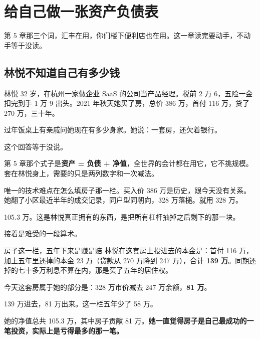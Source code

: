 \chapter{给自己做一张资产负债表}

\begin{ledetext}
第 5 章那三个词，汇丰在用，你们楼下便利店也在用。这一章读完要动手，不动手等于没读。
\end{ledetext}

\section{林悦不知道自己有多少钱}

林悦 32 岁，在杭州一家做企业 SaaS 的公司当产品经理。税前 2 万 6，五险一金扣完到手 1 万 9 出头。2021 年秋天她买了房，总价 386 万，首付 116 万，贷了 270 万，三十年。

过年饭桌上有亲戚问她现在有多少身家。她说：一套房，还欠着银行。

这个回答等于没说。

第 5 章那个式子是\textbf{资产 = 负债 + 净值}，全世界的会计都在用它，它不挑规模。套在林悦身上，需要的只是两列数字和一次减法。

唯一的技术难点在怎么填房子那一栏。买入价 386 万是历史，跟今天没有关系。她翻了小区最近半年的成交记录，同户型同朝向，328 万落槌。就用 328 万。

\begin{bsheet}
\end{bsheet}

105.3 万。这是林悦真正拥有的东西，是把所有杠杆抽掉之后剩下的那一块。

接着是难受的一段算术。

\begin{egbox}{房子这一栏，五年下来是赚是赔}
林悦在这套房上投进去的本金是：首付 116 万，加上五年里还掉的本金 23 万（贷款从 270 万降到 247 万），合计 \textbf{139 万}。同期还掉的七十多万利息不算在内，那是买了五年的居住权。

今天这套房属于她的部分是：328 万市价减去 247 万余额，\textbf{81 万}。

139 万进去，81 万出来。这一栏五年少了 58 万。

她的净值总共 105.3 万，其中房子贡献 81 万。\textbf{她一直觉得房子是自己最成功的一笔投资，实际上是亏得最多的那一笔。}

\end{egbox}

